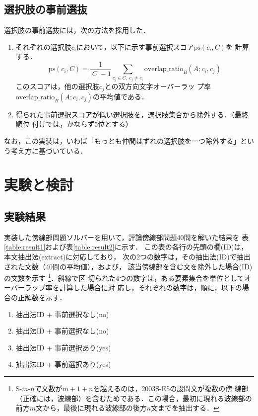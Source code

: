 \documentclass[japanese]{jnlp_1.4}
\begin{document}
\subsection{選択肢の事前選抜}

選択肢の事前選抜には，次の方法を採用した．
\begin{enumerate}
\item 
それぞれの選択肢$c_i$において，以下に示す事前選択スコア$\mathrm{ps}(c_i, C)$を
計算する．
\begin{equation}
\mathrm{ps}(c_i, C) = 
\frac{1}{|C|-1} \sum_{c_j \in C, \ c_j \ne c_i}  \mathrm{overlap\_ratio}_B(A; c_i, c_j)
\end{equation}
このスコアは，他の選択肢$c_j$との双方向文字オーバーラッ
プ率$\mathrm{overlap\_ratio}_B(A; c_i, c_j)$の平均値である．
\item
得られた事前選択スコアが低い選択肢を，選択肢集合から除外する．（最終順位
付けでは，かならず5位とする）
\end{enumerate}

なお，この実装は，いわば「もっとも仲間はずれの選択肢を一つ除外する」という考え方に基づいている．


\section{実験と検討}

\subsection{実験結果}

実装した傍線部問題ソルバーを用いて，評論傍線部問題40問を解いた結果を
表\ref{table:result1}および表\ref{table:result2}に示す．
この表の各行の先頭の欄(ID)は，本文抽出法($\mathrm{extract}$)に対応しており，
次の2つの数字は，その抽出法(ID)で抽出された文数（40問の平均値），および，
該当傍線部を含む文を除外した場合($\overline{\mbox{ID}}$)の文数を示す
\footnote{S-$m$-$n$で文数が$m+1+n$を越えるのは，2003S-E5の設問文が複数の傍
線部（正確には，波線部）を含むためである．この場合，最初に現れる波線部の
前方$m$文から，最後に現れる波線部の後方$n$文までを抽出する．}．斜線で区
切られた4つの数字は，ある要素集合を単位としてオーバーラップ率を計算した場合に対
応し，それぞれの数字は，順に，以下の場合の正解数を示す．
\begin{enumerate}
\item 抽出法ID + 事前選択なし(no)
\item 抽出法$\overline{\mbox{ID}}$ + 事前選択なし(no)
\item 抽出法ID + 事前選択あり(yes)
\item 抽出法$\overline{\mbox{ID}}$ + 事前選択あり(yes)
\end{enumerate}
\end{document}
